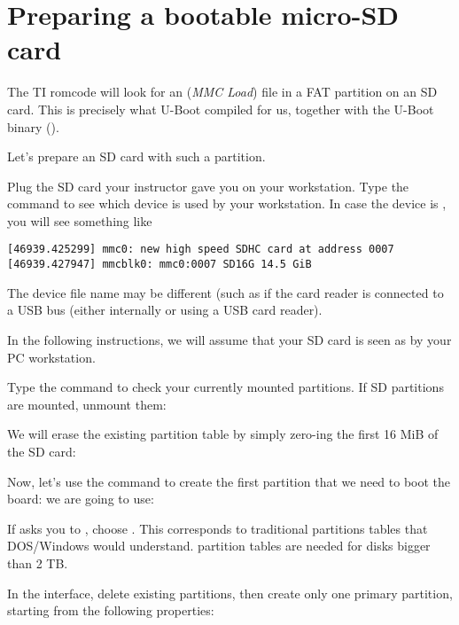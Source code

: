 \section{Preparing a bootable micro-SD card}

The TI romcode will look for an  ({\em MMC Load})
file in a FAT partition on an SD card. This is precisely what U-Boot
compiled for us, together with the U-Boot binary ().

Let's prepare an SD card with such a partition.

Plug the SD card your instructor gave you on your workstation. Type
the  command to see which device is used by your
workstation. In case the device is , you will see
something like

\begin{verbatim}
[46939.425299] mmc0: new high speed SDHC card at address 0007
[46939.427947] mmcblk0: mmc0:0007 SD16G 14.5 GiB
\end{verbatim}

The device file name may be different (such as 
if the card reader is connected to a USB bus (either internally
or using a USB card reader).

In the following instructions, we will assume that your SD card is
seen as  by your PC workstation.

Type the  command to check your currently mounted
partitions. If SD partitions are mounted, unmount them:


We will erase the existing partition table by simply zero-ing the
first 16 MiB of the SD card:


Now, let's use the  command to create the first partition
that we need to boot the board:
we are going to use:


If  asks you to , choose
. This corresponds to traditional partitions tables that DOS/Windows
would understand.  partition tables are needed for disks bigger
than 2 TB.

In the  interface, delete existing partitions, then
create only one primary partition, starting from the
following properties:

